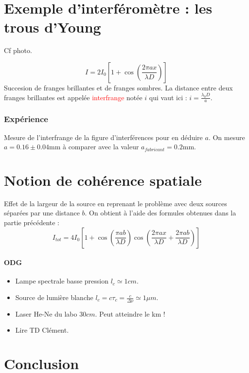 \documentclass[11pt]{report}
\numberwithin{figure}{section}
\numberwithin{equation}{section}
\numberwithin{table}{section}
\newcommand{\1}{\boldsymbol{1}}
\begin{document}
\section{Exemple d'interféromètre : les trous d'Young}
Cf photo.

\begin{equation}
    I = 2I_0\left[1+\cos\left(\frac{2\pi ax}{\lambda D}\right)\right]
\end{equation}
Succesion de franges brillantes et de franges sombres. La distance entre deux franges brillantes est appelée \textcolor{red}{interfrange} notée $i$ qui vaut ici : $i=\frac{\lambda_0D}{a}$.


\subsubsection*{Expérience} Mesure de l'interfrange de la figure d'interférences pour en déduire $a$. On mesure $a=0.16\pm0.04$mm à comparer avec la valeur $a_{fabricant}=0.2$mm.

\section{Notion de cohérence spatiale}
Effet de la largeur de la source en reprenant le problème avec deux sources séparées par une distance $b$. On obtient à l'aide des formules obtenues dans la partie précédente : 
\begin{equation}
    I_{tot} = 4I_0\left[1+\cos\left(\frac{\pi ab}{\lambda D}\right)\cos\left(\frac{2\pi a x}{\lambda D}+\frac{2\pi a b}{\lambda D}\right)\right]
\end{equation}

\paragraph{ODG}
\begin{itemize}
\item Lampe spectrale basse pression $l_c \simeq 1cm$.
\item Source de lumière blanche $l_c = c \tau_c = \frac{c}{\Delta \nu} \simeq 1 \mu m$.
\item Laser He-Ne du labo $30cm$. Peut atteindre le km ! 
\item Lire TD Clément.
\end{itemize}

\section*{Conclusion}
\end{document}
